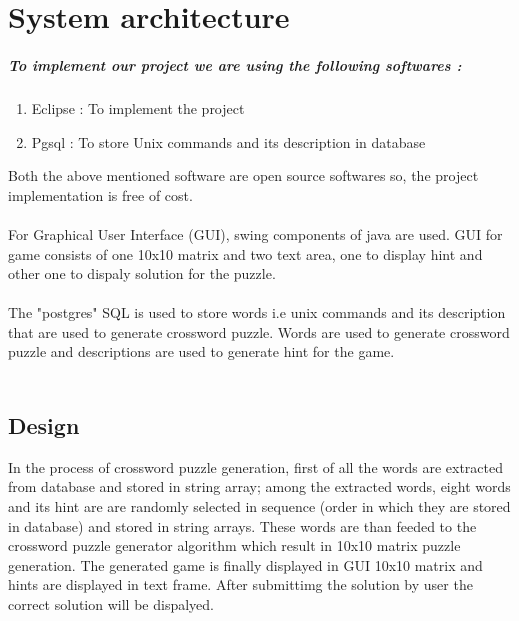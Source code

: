 \chapter{System architecture}

\paragraph*{To implement our project we are using the following softwares :} 
\begin{enumerate}
\setlength{\itemsep}{-0.3em}
\item Eclipse : To implement the project
\item Pgsql : To store Unix commands and its description in database
\end{enumerate}

\vspace*{3 ex}

Both the above mentioned software are open source softwares so, the project implementation is free of cost.\\ \\
For Graphical User Interface (GUI), swing components of java are used. GUI for game consists of one 10x10 matrix and two text area, one to display hint and other one to dispaly solution for the puzzle.\\ \\
The "postgres" SQL is used to store words i.e unix commands and its description that are used to generate crossword puzzle. Words are used to generate crossword puzzle and descriptions are used to generate hint for the game.\\ \\


\section{Design}
\vspace*{3 ex}
In the process of crossword puzzle generation, first of all the words are extracted from database and stored in string array; among the extracted words, eight words and its hint are are randomly selected in sequence (order in which they are stored in database) and stored in string arrays. These words are than feeded to the crossword puzzle generator algorithm which result in 10x10 matrix puzzle generation. The generated game is finally displayed in GUI 10x10 matrix and hints are displayed in text frame. After submittimg the solution by user the correct solution will be dispalyed.\vspace*{7 ex}

